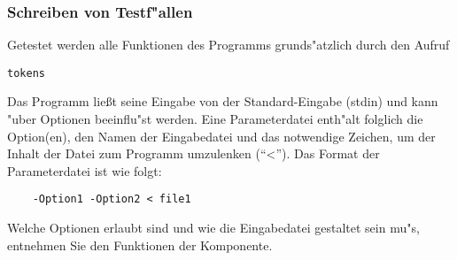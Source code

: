 \subsubsection*{Schreiben von Testf"allen}

Getestet werden alle Funktionen des Programms grunds"atzlich durch den
Aufruf 
\begin{verbatim}
tokens
\end{verbatim}
Das Programm lie{\ss}t seine Eingabe von der Standard-Eingabe (stdin) und
kann "uber Optionen beeinflu"st werden. Eine Parameterdatei enth"alt folglich 
die Option(en), den Namen der Eingabedatei 
und das notwendige Zeichen, um der Inhalt der Datei zum Programm
umzulenken (``<'').
Das Format der Parameterdatei ist wie folgt:
\begin{verbatim}
    -Option1 -Option2 < file1
\end{verbatim}

Welche Optionen erlaubt sind und wie die Eingabedatei gestaltet sein
mu"s, entnehmen Sie den Funktionen der Komponente. 
